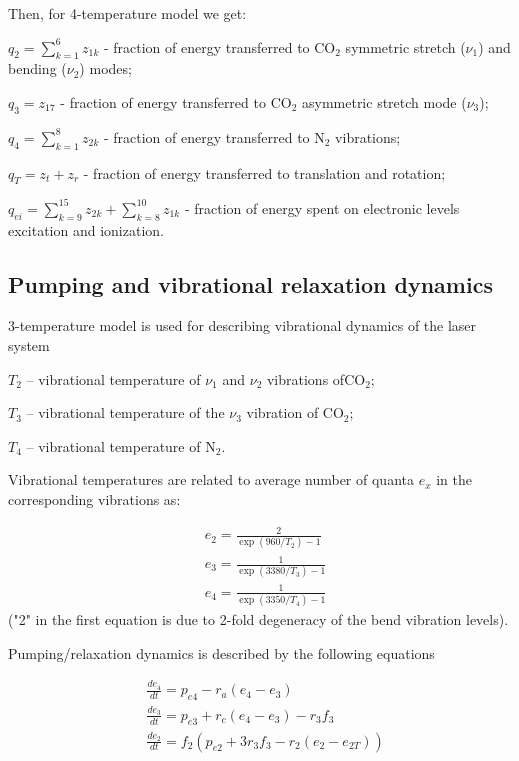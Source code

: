 \documentclass{report}
\begin{document}
Then, for 4-temperature model we get:

$q_2 = \sum\limits_{k=1}^6 z_{1k}$ - fraction of energy transferred to {CO$_2$} symmetric stretch ($\nu_1$) and bending ($\nu_2$) modes;

$q_3 = z_{17}$ - fraction of energy transferred to {CO$_2$} asymmetric stretch mode ($\nu_3$);

$q_4 = \sum\limits_{k=1}^8 z_{2k}$ - fraction of energy transferred to {N$_2$} vibrations;

$q_T = z_t + z_r$ - fraction of energy transferred to translation and rotation;

$q_{ei} = \sum\limits_{k=9}^{15} z_{2k}  + \sum\limits_{k=8}^{10} z_{1k}$ - fraction of energy spent on electronic levels excitation and ionization.


\subsection{Pumping and vibrational relaxation dynamics}
3-temperature model is used for describing vibrational dynamics of the laser system

$T_2$ – vibrational temperature of $\nu_1$ and $\nu_2$ vibrations of{CO$_2$};

$T_3$ – vibrational temperature of the $\nu_3$ vibration of {CO$_2$};

$T_4$ – vibrational temperature of {N$_2$}.

Vibrational temperatures are related to average number of quanta $e_x$ in the corresponding vibrations as:

\begin{align}\label{eq:e}
&{e_2} = \frac{2}{\exp(960/{T_2})-1}  \nonumber\\
&{e_3} = \frac{1}{\exp(3380/{T_3})-1} \\
&{e_4} = \frac{1}{\exp(3350/{T_4})-1} \nonumber
\end{align}
("2" in the first equation is due to 2-fold degeneracy of the bend vibration levels).

Pumping/relaxation dynamics is described by the following equations \cite{Karlov-1978}

\begin{align}\label{eq:dedt}
&\frac{d e_4}{dt} = p_{e4} - r_a (e_4 - e_3)\nonumber\\
&\frac{d e_3}{dt} = p_{e3} + r_c(e_4 - e_3) - r_3 f_3\\
&\frac{d e_2}{dt} = f_2 \left( p_{e2} + 3 r_3 f_3 - r_2 (e_2 - e_{2T}) \right)\nonumber
\end{align}
\end{document}
